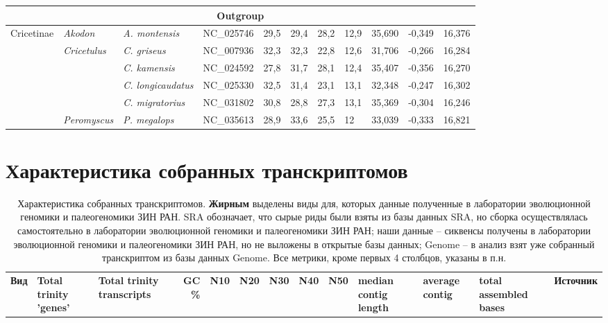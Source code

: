 \begin{landscape}
\begin{longtable}{|l|l|l|c|c|c|c|c|c|c|c|}
				\multicolumn{11}{|c|}{Outgroup} \\ \hline
				\multirow{6}{*}{Cricetinae} & \textit{Akodon} & \textit{A. montensis} & NC\_025746 & 29,5 & 29,4 & 28,2 & 12,9 & 35,690 & -0,349 & 16,376 \\ \cline{2-11} 
				& \multirow{4}{*}{\textit{Cricetulus}} & \textit{C. griseus} & NC\_007936 & 32,3 & 32,3 & 22,8 & 12,6 & 31,706 & -0,266 & 16,284 \\ \cline{3-11} 
				&  & \textit{C. kamensis} & NC\_024592 & 27,8 & 31,7 & 28,1 & 12,4 & 35,407 & -0,356 & 16,270 \\ \cline{3-11} 
				&  & \textit{C. longicaudatus} & NC\_025330 & 32,5 & 31,4 & 23,1 & 13,1 & 32,348 & -0,247 & 16,302 \\ \cline{3-11} 
				&  & \textit{C. migratorius} & NC\_031802 & 30,8 & 28,8 & 27,3 & 13,1 & 35,369 & -0,304 & 16,246 \\ \cline{2-11} 
				& \textit{Peromyscus} & \textit{P. megalops} & \multicolumn{1}{l|}{NC\_035613} & \multicolumn{1}{l|}{28,9} & \multicolumn{1}{l|}{33,6} & \multicolumn{1}{l|}{25,5} & \multicolumn{1}{l|}{12} & 33,039 & -0,333 & 16,821 \\ \hline

\end{longtable}


\chapter{Характеристика собранных транскриптомов}
	
\begin{longtable}{|p{4.2cm}|p{1.5cm}|p{2.2cm}|p{1cm}|p{1cm}|p{1cm}|p{1cm}|p{1cm}|p{1cm}|p{1.5cm}|p{1.5cm}|p{2cm}|p{2.5cm}|}
	\caption{Характеристика собранных транскриптомов. \textbf{Жирным} выделены виды для, которых данные полученные в лаборатории эволюционной геномики и палеогеномики ЗИН РАН. SRA обозначает, что сырые риды были взяты из базы данных SRA, но сборка осуществлялась самостоятельно в лаборатории эволюционной геномики и палеогеномики ЗИН РАН; наши данные -- сиквенсы получены в лаборатории эволюционной геномики и палеогеномики ЗИН РАН, но не выложены в открытые базы данных; Genome -- в анализ взят уже собранный транскриптом из базы данных Genome. Все метрики, кроме первых 4 столбцов, указаны в п.н.} \label{rna_stats} \vspace{5mm} \\
		
\hline
\multicolumn{1}{|c|}{\textbf{Вид}} & \multicolumn{1}{p{1cm}|}{\textbf{Total trinity 'genes'}} & \multicolumn{1}{p{1cm}|}{\textbf{Total trinity transcripts}} & \multicolumn{1}{r|}{\textbf{GC \%}} & \multicolumn{1}{c|}{\textbf{N10}} & \multicolumn{1}{c|}{\textbf{N20}} & \multicolumn{1}{c|}{\textbf{N30}} & \multicolumn{1}{c|}{\textbf{N40}} & \multicolumn{1}{c|}{\textbf{N50}} & \multicolumn{1}{p{1cm}|}{\textbf{median contig length}} & \multicolumn{1}{p{1cm}|}{\textbf{average contig}} & \multicolumn{1}{p{1cm}|}{\textbf{total assembled bases}} &\multicolumn{1}{p{1cm}|}{\textbf{Источник}} \\ \hline
		

\end{longtable}
\end{landscape}
